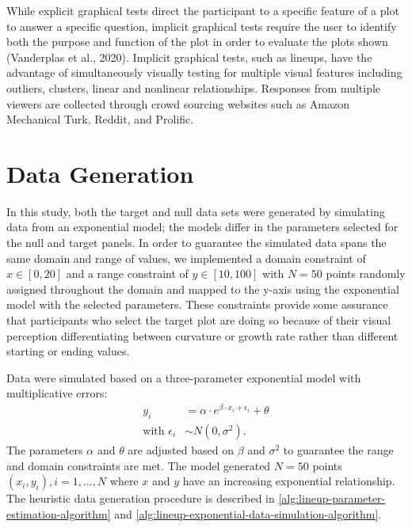 \documentclass[print]{nuthesis}
\begin{document}
While explicit graphical tests direct the participant to a specific feature of a plot to answer a specific question, implicit graphical tests require the user to identify both the purpose and function of the plot in order to evaluate the plots shown (Vanderplas et al., 2020).
Implicit graphical tests, such as lineups, have the advantage of simultaneously visually testing for multiple visual features including outliers, clusters, linear and nonlinear relationships. Responses from multiple viewers are collected through crowd sourcing websites such as Amazon Mechanical Turk, Reddit, and Prolific.

\hypertarget{data-generation}{%
\section{Data Generation}\label{data-generation}}

In this study, both the target and null data sets were generated by simulating data from an exponential model; the models differ in the parameters selected for the null and target panels.
In order to guarantee the simulated data spans the same domain and range of values, we implemented a domain constraint of \(x\in [0,20]\) and a range constraint of \(y\in [10,100]\) with \(N = 50\) points randomly assigned throughout the domain and mapped to the y-axis using the exponential model with the selected parameters.
These constraints provide some assurance that participants who select the target plot are doing so because of their visual perception differentiating between curvature or growth rate rather than different starting or ending values.

Data were simulated based on a three-parameter exponential model with multiplicative errors:
\begin{align}
y_i & = \alpha\cdot e^{\beta\cdot x_i + \epsilon_i} + \theta \\
\text{with } \epsilon_i & \sim N(0, \sigma^2). \nonumber
\end{align}
The parameters \(\alpha\) and \(\theta\) are adjusted based on \(\beta\) and \(\sigma^2\) to guarantee the range and domain constraints are met.
The model generated \(N = 50\) points \((x_i, y_i), i = 1,...,N\) where \(x\) and \(y\) have an increasing exponential relationship.
The heuristic data generation procedure is described in \cref{alg:lineup-parameter-estimation-algorithm} and \cref{alg:lineup-exponential-data-simulation-algorithm}.
\end{document}
